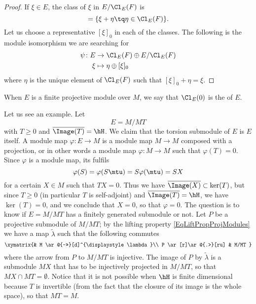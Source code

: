 \begin{proof}
If $\xi\in E$, the class of $\xi$ in $E/\Cl_E(F)$ is
\begin{equation}
	[\xi]=\{ \xi+\eta\tq \eta\in\Cl_E(F) \}.
\end{equation}
Let us choose a representative $[\xi]_0$ in each of the classes. The following is the module isomorphism we are searching for
\begin{equation}
\begin{aligned}
 \psi\colon E&\to \Cl_E(F)\oplus E/\Cl_E(F) \\
   \xi&\mapsto  \eta\oplus [\xi]_0
\end{aligned}
\end{equation}
where $\eta$ is the unique element of $\Cl_E(F)$ such that $[\xi]_0+\eta=\xi$.
\end{proof}

When $E$ is a finite projective module over $M$, we say that $\Cl_E(0)$ is the  of $E$.

Let us see an example. Let
\begin{equation}
	E=M/MT
\end{equation}
with $T\geq 0$ and $\overline{ \Image(T) }=\hH$. We claim that the torsion submodule of $E$ is $E$ itself. A module map $\varphi\colon E\to M$ is a module map $M\to M$ composed with a projection, or in other words a module map $\varphi\colon M\to M$ such that $\varphi(T)=0$. Since $\varphi$ is a module map, its fulfils
\begin{equation}
	\varphi(S)=\varphi(S\mtu)=S\varphi(\mtu)=SX
\end{equation}
for a certain $X\in M$ such that $TX=0$. Thus we have $\overline{ \Image(X) }\subset\ker(T)$, but since $T\geq 0$ (in particular $T$ is self-adjoint) and $\overline{ \Image(T) }=\hH$, we have $\ker(T)=0$, and we conclude that $X=0$, so that $\varphi=0$. The question is to know if $E=M/MT$ has a finitely generated submodule or not. Let $P$ be a projective submodule of $M/MT$; by the lifting property \eqref{EqLiftPropProjModules} we have a map $\tilde \lambda$ such that the following commutes
\begin{equation}
\xymatrix{%
 									&  M \ar@{->>}[d]^{\displaystyle\lambda}\\
   P \ar[r]\ar@{.>}[ru]							& M/MT
}
\end{equation}
where the arrow from $P$ to $M/MT$ is injective. The image of $P$ by $\tilde\lambda$ is a submodule $MX$ that has to be injectively projected in $M/MT$, so that $MX\cap MT=\emptyset$. Notice that it is not possible when $\hH$ is finite dimensional because $T$ is invertible (from the fact that the closure of its image is the whole space), so that $MT=M$.

